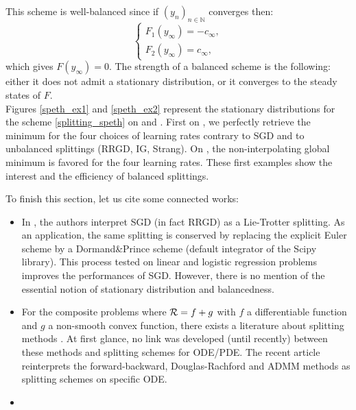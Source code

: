 \documentclass[article,authoryear,jmlmc]{beg_32}             %
\begin{document}
This scheme is well-balanced since if $(y_n)_{n\in \mathbb{N}}$ converges then:
\begin{equation*}
	\left\{
	\begin{array}{ll}
		F_1(y_{\infty})=-c_{\infty}, \\
		F_2(y_{\infty})=c_{\infty},
	\end{array}
	\right.
\end{equation*}
which gives $F(y_{\infty})=0$. The strength of a balanced scheme is the following: either it does not admit a stationary distribution, or it converges to the steady states of $F$.\\
Figures \ref{speth_ex1} and \ref{speth_ex2} represent the stationary distributions for the scheme \eqref{splitting_speth} on \exOne and \exTwo. First on \exOne, we perfectly retrieve the minimum for the four choices of learning rates contrary to SGD and to unbalanced splittings (RRGD, IG, Strang). On \exTwo, the non-interpolating global minimum is favored for the four learning rates. These first examples show the interest and the efficiency of balanced splittings. 

\begin{remark}
	To finish this section, let us cite some connected works:
	\begin{itemize}
		\item In \cite{splitting_sgd}, the authors interpret SGD (in fact RRGD) as a Lie-Trotter splitting. As an application, the same splitting is conserved by replacing the explicit Euler scheme by a Dormand\&Prince scheme (default integrator of the Scipy library). This process tested on linear and logistic regression problems improves the performances of SGD. However, there is no mention of the essential notion of stationary distribution and balancedness. 
		\item For the composite problems where $\mathcal{R}=f+g$ with $f$ a differentiable function and $g$ a non-smooth convex function, there exists a literature about splitting methods \cite{splitting_proximal}. At first glance, no link was developed (until recently) between these methods and splitting schemes for ODE/PDE. The recent article \cite{splitting_proximal_ode} reinterprets the forward-backward, Douglas-Rachford and ADMM methods as splitting schemes on specific ODE.   
                \item {}
	\end{itemize}
\end{remark}
\end{document}

